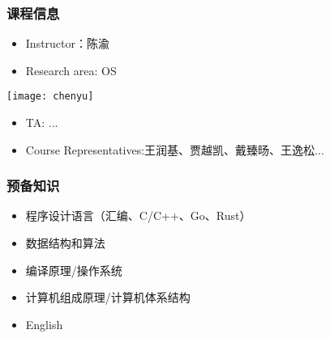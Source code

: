 %
%
\begin{frame}[plain,t]
	\frametitle{课程信息}
	\begin{itemize}
		\item Instructor：陈渝	 
		\item Research area: OS
	\end{itemize}	
	\texttt{[image: chenyu]}

 	\begin{itemize}
 		\item TA: ...
		\item Course Representatives:王润基、贾越凯、戴臻旸、王逸松...
	\end{itemize}


\end{frame}
\begin{frame}[plain]

\frametitle{预备知识}

\begin{itemize}

\item 程序设计语言（汇编、C/C++、Go、Rust）
\item 数据结构和算法 \pause
\item 编译原理/操作系统 
\item 计算机组成原理/计算机体系结构 \pause

\item English
\end{itemize}

\end{frame}
